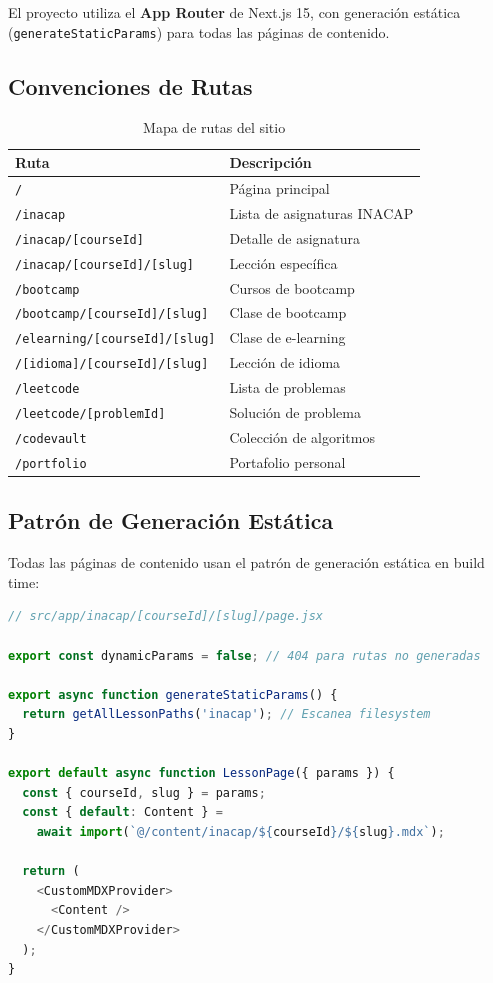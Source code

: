\documentclass[12pt,a4paper]{article}
\begin{document}
El proyecto utiliza el \textbf{App Router} de Next.js 15, con generación estática (\texttt{generateStaticParams}) para todas las páginas de contenido.

\subsection{Convenciones de Rutas}

\begin{table}[h]
\centering
\begin{tabular}{ll}
\toprule
\textbf{Ruta} & \textbf{Descripción} \\
\midrule
\texttt{/} & Página principal \\
\texttt{/inacap} & Lista de asignaturas INACAP \\
\texttt{/inacap/[courseId]} & Detalle de asignatura \\
\texttt{/inacap/[courseId]/[slug]} & Lección específica \\
\texttt{/bootcamp} & Cursos de bootcamp \\
\texttt{/bootcamp/[courseId]/[slug]} & Clase de bootcamp \\
\texttt{/elearning/[courseId]/[slug]} & Clase de e-learning \\
\texttt{/[idioma]/[courseId]/[slug]} & Lección de idioma \\
\texttt{/leetcode} & Lista de problemas \\
\texttt{/leetcode/[problemId]} & Solución de problema \\
\texttt{/codevault} & Colección de algoritmos \\
\texttt{/portfolio} & Portafolio personal \\
\bottomrule
\end{tabular}
\caption{Mapa de rutas del sitio}
\end{table}

\subsection{Patrón de Generación Estática}

Todas las páginas de contenido usan el patrón de generación estática en build time:

\begin{lstlisting}[language=JavaScript, caption={Patrón de generación estática típico}]
// src/app/inacap/[courseId]/[slug]/page.jsx

export const dynamicParams = false; // 404 para rutas no generadas

export async function generateStaticParams() {
  return getAllLessonPaths('inacap'); // Escanea filesystem
}

export default async function LessonPage({ params }) {
  const { courseId, slug } = params;
  const { default: Content } =
    await import(`@/content/inacap/${courseId}/${slug}.mdx`);

  return (
    <CustomMDXProvider>
      <Content />
    </CustomMDXProvider>
  );
}
\end{lstlisting}
\end{document}
